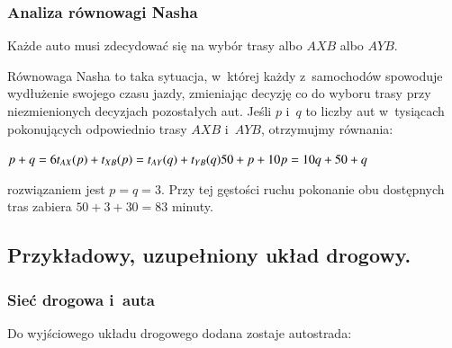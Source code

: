 \documentclass[twoside,12pt]{report}
\begin{document}
\subsubsection{Analiza równowagi Nasha}

Każde auto musi zdecydować się na wybór trasy albo $AXB$ albo $AYB$.

Równowaga Nasha to taka sytuacja, w~której każdy z~samochodów spowoduje wydłużenie swojego czasu jazdy, zmieniając decyzję co do wyboru trasy przy niezmienionych decyzjach pozostałych aut.
\newline\newline
Jeśli $p$ i~$q$ to liczby aut w~tysiącach pokonujących odpowiednio trasy $AXB$ i~$AYB$, otrzymujmy równania:

\begin{center}
\begin{math}
p+q = 6 \newline
t_{AX}(p)+t_{XB}(p) = t_{AY}(q) + t_{YB}(q) \newline
50+p+10p = 10q+50+q \newline
\end{math}
\end{center}
rozwiązaniem jest $p=q=3$.
Przy tej gęstości ruchu pokonanie obu dostępnych tras zabiera $50+3+30=83$ minuty.

\subsection{Przykładowy, uzupełniony układ drogowy.}
\subsubsection{Sieć drogowa i~auta}
Do wyjściowego układu drogowego dodana zostaje autostrada:
\end{document}
